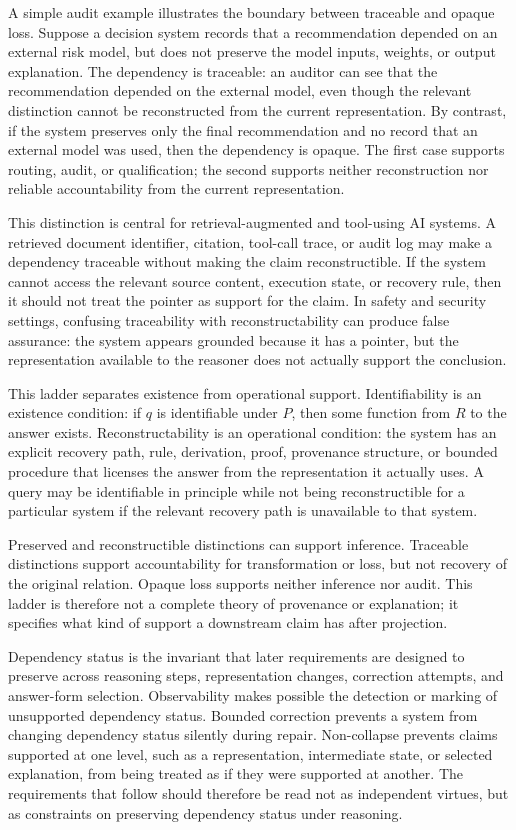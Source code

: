 \documentclass[11pt]{article}
\begin{document}
A simple audit example illustrates the boundary between traceable and opaque loss. Suppose a decision system records that a recommendation depended on an external risk model, but does not preserve the model inputs, weights, or output explanation. The dependency is traceable: an auditor can see that the recommendation depended on the external model, even though the relevant distinction cannot be reconstructed from the current representation. By contrast, if the system preserves only the final recommendation and no record that an external model was used, then the dependency is opaque. The first case supports routing, audit, or qualification; the second supports neither reconstruction nor reliable accountability from the current representation.

This distinction is central for retrieval-augmented and tool-using AI systems. A retrieved document identifier, citation, tool-call trace, or audit log may make a dependency traceable without making the claim reconstructible. If the system cannot access the relevant source content, execution state, or recovery rule, then it should not treat the pointer as support for the claim. In safety and security settings, confusing traceability with reconstructability can produce false assurance: the system appears grounded because it has a pointer, but the representation available to the reasoner does not actually support the conclusion.

This ladder separates existence from operational support. Identifiability is an existence condition: if $q$ is identifiable under $P$, then some function from $R$ to the answer exists. Reconstructability is an operational condition: the system has an explicit recovery path, rule, derivation, proof, provenance structure, or bounded procedure that licenses the answer from the representation it actually uses. A query may be identifiable in principle while not being reconstructible for a particular system if the relevant recovery path is unavailable to that system.

Preserved and reconstructible distinctions can support inference. Traceable distinctions support accountability for transformation or loss, but not recovery of the original relation. Opaque loss supports neither inference nor audit. This ladder is therefore not a complete theory of provenance or explanation; it specifies what kind of support a downstream claim has after projection.

Dependency status is the invariant that later requirements are designed to preserve across reasoning steps, representation changes, correction attempts, and answer-form selection. Observability makes possible the detection or marking of unsupported dependency status. Bounded correction prevents a system from changing dependency status silently during repair. Non-collapse prevents claims supported at one level, such as a representation, intermediate state, or selected explanation, from being treated as if they were supported at another. The requirements that follow should therefore be read not as independent virtues, but as constraints on preserving dependency status under reasoning.
\end{document}

